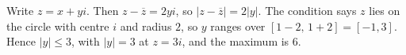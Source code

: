 Write $z=x+yi$. Then $z-\overline z=2yi$, so $|z-\overline z|=2|y|$. The condition says $z$ lies on the circle with centre $i$ and radius $2$, so $y$ ranges over $[1-2,\,1+2]=[-1,3]$. Hence $|y|\le3$, with $|y|=3$ at $z=3i$, and the maximum is $\boxed{6}$.
